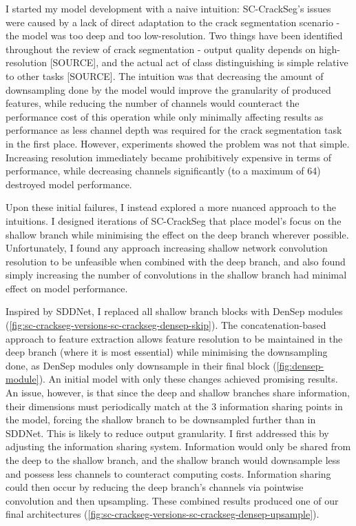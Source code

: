 \documentclass[a4paper,12pt]{report}
\begin{document}
I started my model development with a naive intuition: SC-CrackSeg's issues were caused by a lack of direct adaptation to the crack segmentation scenario - the model was too deep and too low-resolution. Two things have been identified throughout the review of crack segmentation - output quality depends on high-resolution [SOURCE], and the actual act of class distinguishing is simple relative to other tasks [SOURCE]. The intuition was that decreasing the amount of downsampling done by the model would improve the granularity of produced features, while reducing the number of channels would counteract the performance cost of this operation while only minimally affecting results as performance as less channel depth was required for the crack segmentation task in the first place. However, experiments showed the problem was not that simple. Increasing resolution immediately became prohibitively expensive in terms of performance, while decreasing channels significantly (to a maximum of 64) destroyed model performance.

Upon these initial failures, I instead explored a more nuanced approach to the intuitions. I designed iterations of SC-CrackSeg that place model's focus on the shallow branch while minimising the effect on the deep branch wherever possible. Unfortunately, I found any approach increasing shallow network convolution resolution to be unfeasible when combined with the deep branch, and also found simply increasing the number of convolutions in the shallow branch had minimal effect on model performance.

Inspired by SDDNet, I replaced all shallow branch blocks with DenSep modules (\autoref{fig:sc-crackseg-versions-sc-crackseg-densep-skip}). The concatenation-based approach to feature extraction allows feature resolution to be maintained in the deep branch (where it is most essential) while minimising the downsampling done, as DenSep modules only downsample in their final block (\autoref{fig:densep-module}). An initial model with only these changes achieved promising results. An issue, however, is that since the deep and shallow branches share information, their dimensions must periodically match at the 3 information sharing points in the model, forcing the shallow branch to be downsampled further than in SDDNet. This is likely to reduce output granularity. I first addressed this by adjusting the information sharing system. Information would only be shared from the deep to the shallow branch, and the shallow branch would downsample less and possess less channels to counteract computing costs. Information sharing could then occur by reducing the deep branch's channels via pointwise convolution and then upsampling. These combined results produced one of our final architectures (\autoref{fig:sc-crackseg-versions-sc-crackseg-densep-upsample}).
\end{document}
